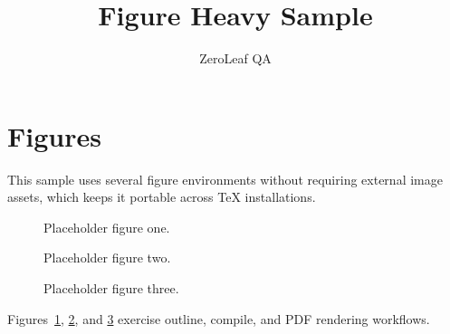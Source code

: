 \documentclass{article}
\title{Figure Heavy Sample}
\author{ZeroLeaf QA}
\begin{document}
\maketitle

\section{Figures}
This sample uses several figure environments without requiring external image
assets, which keeps it portable across TeX installations.

\begin{figure}[ht]
\centering
\fbox{\rule{0pt}{1in}\rule{0.8\linewidth}{0pt}}
\caption{Placeholder figure one.}
\label{fig:one}
\end{figure}

\begin{figure}[ht]
\centering
\fbox{\rule{0pt}{1.2in}\rule{0.7\linewidth}{0pt}}
\caption{Placeholder figure two.}
\label{fig:two}
\end{figure}

\begin{figure}[ht]
\centering
\fbox{\rule{0pt}{0.9in}\rule{0.6\linewidth}{0pt}}
\caption{Placeholder figure three.}
\label{fig:three}
\end{figure}

Figures~\ref{fig:one}, \ref{fig:two}, and \ref{fig:three} exercise outline,
compile, and PDF rendering workflows.
\end{document}

